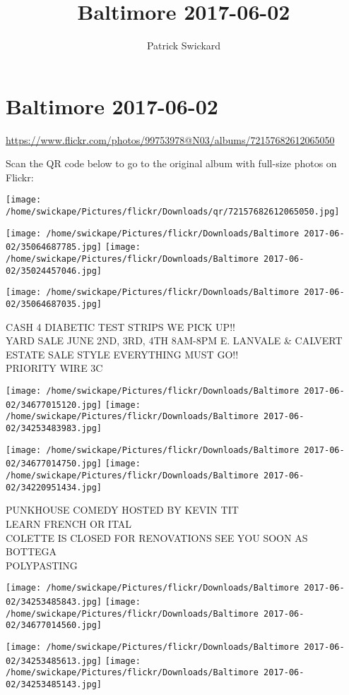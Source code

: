 \documentclass[10pt,letterpaper]{article}
\title{Baltimore 2017-06-02}
\author{Patrick Swickard}
\date{}
\begin{document}
\section*{Baltimore 2017-06-02}

\url{https://www.flickr.com/photos/99753978@N03/albums/72157682612065050}

Scan the QR code below to go to the original album with full-size photos on Flickr:

\texttt{[image: /home/swickape/Pictures/flickr/Downloads/qr/72157682612065050.jpg]}
\pagebreak

\texttt{[image: /home/swickape/Pictures/flickr/Downloads/Baltimore 2017-06-02/35064687785.jpg]}
\texttt{[image: /home/swickape/Pictures/flickr/Downloads/Baltimore 2017-06-02/35024457046.jpg]}

\vspace{0.25in}
\texttt{[image: /home/swickape/Pictures/flickr/Downloads/Baltimore 2017-06-02/35064687035.jpg]}

CASH 4 DIABETIC TEST STRIPS WE PICK UP!!\\
YARD SALE JUNE 2ND, 3RD, 4TH 8AM{-}8PM E. LANVALE \& CALVERT ESTATE SALE STYLE EVERYTHING MUST GO!!\\
PRIORITY WIRE 3C
\pagebreak

\texttt{[image: /home/swickape/Pictures/flickr/Downloads/Baltimore 2017-06-02/34677015120.jpg]}
\texttt{[image: /home/swickape/Pictures/flickr/Downloads/Baltimore 2017-06-02/34253483983.jpg]}

\texttt{[image: /home/swickape/Pictures/flickr/Downloads/Baltimore 2017-06-02/34677014750.jpg]}
\texttt{[image: /home/swickape/Pictures/flickr/Downloads/Baltimore 2017-06-02/34220951434.jpg]}

PUNKHOUSE COMEDY HOSTED BY KEVIN TIT\\
LEARN FRENCH OR ITAL\\
COLETTE IS CLOSED FOR RENOVATIONS SEE YOU SOON AS BOTTEGA\\
POLYPASTING
\pagebreak

\texttt{[image: /home/swickape/Pictures/flickr/Downloads/Baltimore 2017-06-02/34253485843.jpg]}
\texttt{[image: /home/swickape/Pictures/flickr/Downloads/Baltimore 2017-06-02/34677014560.jpg]}

\texttt{[image: /home/swickape/Pictures/flickr/Downloads/Baltimore 2017-06-02/34253485613.jpg]}
\texttt{[image: /home/swickape/Pictures/flickr/Downloads/Baltimore 2017-06-02/34253485143.jpg]}
\end{document}
